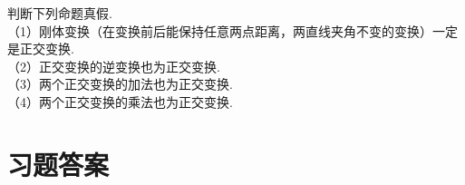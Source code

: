\begin{ex}\label{8.17}
判断下列命题真假.\\
（1）刚体变换（在变换前后能保持任意两点距离，两直线夹角不变的变换）一定是正交变换.\\
（2）正交变换的逆变换也为正交变换.\\
（3）两个正交变换的加法也为正交变换.\\
（4）两个正交变换的乘法也为正交变换.
\end{ex}


\section{习题答案}

